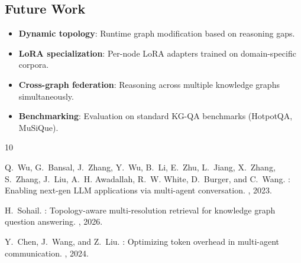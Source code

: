 \documentclass[11pt,a4paper]{article}
\begin{document}
\subsection{Future Work}
\begin{itemize}
    \item \textbf{Dynamic topology}: Runtime graph modification based on reasoning gaps.
    \item \textbf{LoRA specialization}: Per-node LoRA adapters trained on domain-specific corpora.
    \item \textbf{Cross-graph federation}: Reasoning across multiple knowledge graphs simultaneously.
    \item \textbf{Benchmarking}: Evaluation on standard KG-QA benchmarks (HotpotQA, MuSiQue).
\end{itemize}



\begin{thebibliography}{10}

Q.~Wu, G.~Bansal, J.~Zhang, Y.~Wu, B.~Li, E.~Zhu, L.~Jiang, X.~Zhang,
  S.~Zhang, J.~Liu, A.~H. Awadallah, R.~W. White, D.~Burger, and C.~Wang.
: Enabling next-gen LLM applications via multi-agent
  conversation.
, 2023.

H.~Sohail.
: Topology-aware multi-resolution retrieval for knowledge
  graph question answering.
, 2026.

Y.~Chen, J.~Wang, and Z.~Liu.
: Optimizing token overhead in multi-agent communication.
, 2024.

\end{thebibliography}
\end{document}
